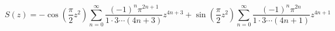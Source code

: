 \documentclass{article}
\begin{document}
\setcounter{equation}{2}
\begin{equation}
S(z) = -\cos\left(\frac{\pi}{2} z^2\right) \sum_{n=0}^\infty 
     \frac{(-1)^n\pi^{2n+1}}{1\cdot3\cdots(4n+3)} z^{4n+3}
       +\sin\left(\frac{\pi}{2} z^2\right) \sum_{n=0}^\infty
     \frac{(-1)^n\pi^{2n}}{1\cdot3\cdots(4n+1)} z^{4n+1}
\end{equation}
\end{document}
